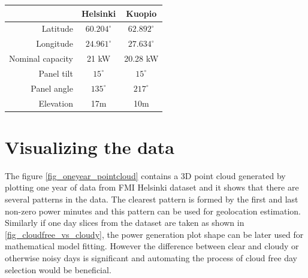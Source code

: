 


\begin{table}[H]
\centering
\begin{tabular}{r|cc} \hline\hline

 & Helsinki & Kuopio\\ \hline
 Latitude & $60.204^\circ$ & $62.892^\circ$ \\
 Longitude & $24.961^\circ$  &  $27.634^\circ$\\
 Nominal capacity &21 kW & 20.28 kW \\
 Panel tilt & $15^\circ$ & $15^\circ$ \\
 Panel angle & $135^\circ$ & $217^\circ$ \\
 Elevation & 17m & 10m\\
\hline\hline
\end{tabular}
\label{table_fmi_helsinki_kuopio_parameters}
\end{table}





\section{Visualizing the data}
The figure \ref{fig_oneyear_pointcloud} contains a 3D point cloud generated by plotting one year of data from FMI Helsinki dataset and it shows that there are several patterns in the data. The clearest pattern is formed by the first and last non-zero power minutes and this pattern can be used for geolocation estimation. Similarly if one day slices from the dataset are taken as shown in \ref{fig_cloudfree_vs_cloudy}, the power generation plot shape can be later used for mathematical model fitting. However the difference between clear and cloudy or otherwise noisy days is significant and automating the process of cloud free day selection would be beneficial.



